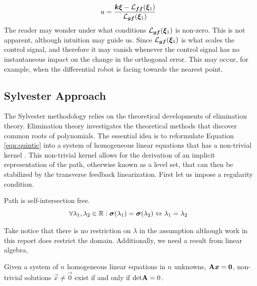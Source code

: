 \documentclass[oneside, 11pt]{book}
\begin{document}
\begin{equation}
    u = \frac{\bm{k}\bm{\xi} - \mathcal{L}_{\bm{f}\bm{f}}(\bm{\xi}_1)}{\mathcal{L}_{\bm{g}\bm{f}}(\bm{\xi}_1)}
\end{equation}
The reader may wonder under what conditions $\mathcal{L}_{\bm{g}\bm{f}}(\bm{\xi}_1)$ is non-zero. This is not apparent, although intuition may guide us. Since $\mathcal{L}_{\bm{g}\bm{f}}(\bm{\xi}_1)$ is what scales the control signal, and therefore it may vanish whenever the control signal has no instantaneous impact on the change in the orthogonal error. This may occur, for example, when the differential robot is facing towards the nearest point.

\subsection{Sylvester Approach}
The Sylvester methodology relies on the theoretical developments of elimination theory. Elimination theory investigates the theoretical methods that discover common roots of polynomials. The essential idea is to reformulate Equation \ref{eqn:quintic} into a system of homogeneous linear equations that has a non-trivial kernel \cite{Sederberg84}. This non-trivial kernel allows for the derivation of an implicit representation of the path, otherwise known as a level set, that can then be stabilized by the transverse feedback linearization. First let us impose a regularity condition.

\begin{assumption}
    Path is self-intersection free.
    \begin{equation*}
        \forall \lambda_1, \lambda_2 \in\mathbb{R} : \bm{\sigma}(\lambda_1) = \bm{\sigma}(\lambda_2) \Leftrightarrow \lambda_1 = \lambda_2
    \end{equation*}
    \label{ass:self_intersect}
\end{assumption}

Take notice that there is no restriction on $\lambda$ in the assumption although work in this report does restrict the domain. Additionally, we need a result from linear algebra,

\begin{theorem}
    Given a system of $n$ homogeneous linear equations in $n$ unknowns, $\mathbf{A}\bm{x}=\bm{0}$, non-trivial solutions $\vec{x}\neq\vec{0}$ exist if and only if $\text{det}\mathbf{A}=0$. \label{thm:kernel}
\end{theorem}
\end{document}
